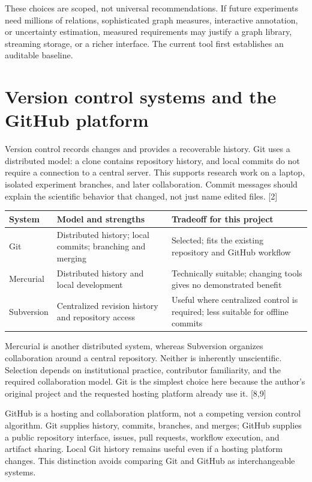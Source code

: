 \documentclass[12pt,a4paper]{article}
\newcommand{\source}[1]{\textnormal{[#1]}}
\begin{document}
These choices are scoped, not universal recommendations. If future experiments need millions of relations, sophisticated graph measures, interactive annotation, or uncertainty estimation, measured requirements may justify a graph library, streaming storage, or a richer interface. The current tool first establishes an auditable baseline.

\clearpage
\section{Version control systems and the GitHub platform}
Version control records changes and provides a recoverable history. Git uses a distributed model: a clone contains repository history, and local commits do not require a connection to a central server. This supports research work on a laptop, isolated experiment branches, and later collaboration. Commit messages should explain the scientific behavior that changed, not just name edited files. \source{2}

\noindent\begin{tabularx}{\textwidth}{|p{2.7cm}|X|X|}\hline
\textbf{System} & \textbf{Model and strengths} & \textbf{Tradeoff for this project} \\\hline
Git & Distributed history; local commits; branching and merging & Selected; fits the existing repository and GitHub workflow \\\hline
Mercurial & Distributed history and local development & Technically suitable; changing tools gives no demonstrated benefit \\\hline
Subversion & Centralized revision history and repository access & Useful where centralized control is required; less suitable for offline commits \\\hline
\end{tabularx}

Mercurial is another distributed system, whereas Subversion organizes collaboration around a central repository. Neither is inherently unscientific. Selection depends on institutional practice, contributor familiarity, and the required collaboration model. Git is the simplest choice here because the author's original project and the requested hosting platform already use it. \source{8,9}

GitHub is a hosting and collaboration platform, not a competing version control algorithm. Git supplies history, commits, branches, and merges; GitHub supplies a public repository interface, issues, pull requests, workflow execution, and artifact sharing. Local Git history remains useful even if a hosting platform changes. This distinction avoids comparing Git and GitHub as interchangeable systems.
\end{document}
